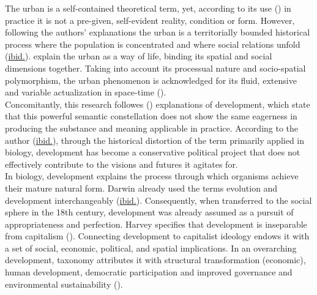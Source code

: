 \documentclass[11pt]{report}
\begin{document}
{{The urban is a self-contained theoretical term, yet, according to its use (\href{Brenner}{\citealt{brenner_urban_2014}}) in practice it is not a pre-given, self-evident reality, condition or form. 
However, following the authors' explanations the urban is a territorially bounded historical process where the population is concentrated and where social relations unfold (\href{Brenner}{ibid.}).
\href{Soja}{\cite{burdett_urbanization_2006}} explain the urban as a way of life, binding its spatial and social dimensions together.
Taking into account its processual nature and socio-spatial polymorphism, the urban phenomenon is acknowledged for its fluid, extensive and variable actualization in space-time (\href{Brenner}{\citealt{brenner_urban_2014}}).
\\

Concomitantly, this research followes (\href{Esteva}{\citealt{esteva_development_2010}}) explanations of development, which state that this powerful semantic constellation does not show the same eagerness in producing the substance and meaning applicable in practice. According to the author (\href{Esteva}{ibid.}), through the historical distortion of the term primarily applied in biology, development has become a conservative political project that does not effectively contribute to the visions and futures it agitates for. 
\\

In biology, development explains the process through which organisms achieve their mature natural form. Darwin already used the terms evolution and development interchangeably  (\href{Esteva}{ibid.}).
Consequently, when transferred to the social sphere in the 18th century, development was already assumed as a pursuit of appropriateness and perfection.
Harvey specifies that development is inseparable from capitalism (\href{Harvey}{\citealt{harvey_urban_1978}}).
Connecting development to capitalist ideology endows it with a set of social, economic, political, and spatial implications.
In an overarching development, taxonomy attributes it with structural transformation (economic), human development, democratic participation and improved governance and environmental sustainability (\href{Vázquez}{\citealt{vazquez_revisiting_2013}}).
\\

}}
\end{document}
